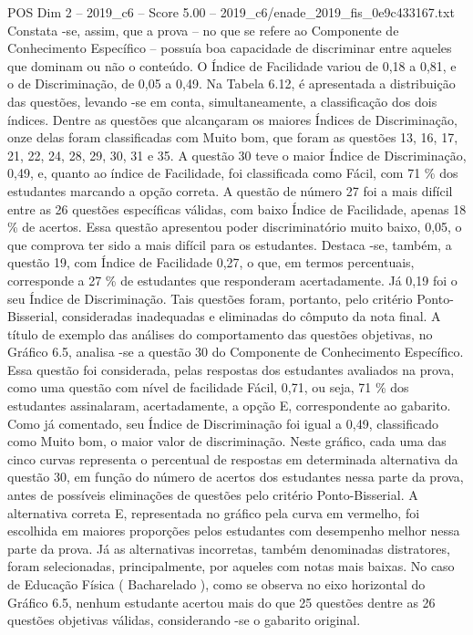 \begin{textsample}{POS Dim 2 – 2019\_c6 – Score 5.00 – 2019\_c6/enade\_2019\_fis\_0e9c433167.txt}
Constata -se, assim, que a prova – no que se refere ao Componente de Conhecimento Específico – possuía boa capacidade de discriminar entre aqueles que dominam ou não o conteúdo.
O Índice de Facilidade variou de 0,18 a 0,81, e o de Discriminação, de 0,05 a 0,49.
Na Tabela 6.12, é apresentada a distribuição das questões, levando -se em conta, simultaneamente, a classificação dos dois índices.
Dentre as questões que alcançaram os maiores Índices de Discriminação, onze delas foram classificadas com Muito bom, que foram as questões 13, 16, 17, 21, 22, 24, 28, 29, 30, 31 e 35.
A questão 30 teve o maior Índice de Discriminação, 0,49, e, quanto ao índice de Facilidade, foi classificada como Fácil, com 71 \% dos estudantes marcando a opção correta.
A questão de número 27 foi a mais difícil entre as 26 questões específicas válidas, com baixo Índice de Facilidade, apenas 18 \% de acertos.
Essa questão apresentou poder discriminatório muito baixo, 0,05, o que comprova ter sido a mais difícil para os estudantes.
Destaca -se, também, a questão 19, com Índice de Facilidade 0,27, o que, em termos percentuais, corresponde a 27 \% de estudantes que responderam acertadamente.
Já 0,19 foi o seu Índice de Discriminação.
Tais questões foram, portanto, pelo critério Ponto-Bisserial, consideradas inadequadas e eliminadas do cômputo da nota final.
A título de exemplo das análises do comportamento das questões objetivas, no Gráfico 6.5, analisa -se a questão 30 do Componente de Conhecimento Específico.
Essa questão foi considerada, pelas respostas dos estudantes avaliados na prova, como uma questão com nível de facilidade Fácil, 0,71, ou seja, 71 \% dos estudantes assinalaram, acertadamente, a opção E, correspondente ao gabarito.
Como já comentado, seu Índice de Discriminação foi igual a 0,49, classificado como Muito bom, o maior valor de discriminação.
Neste gráfico, cada uma das cinco curvas representa o percentual de respostas em determinada alternativa da questão 30, em função do número de acertos dos estudantes nessa parte da prova, antes de possíveis eliminações de questões pelo critério Ponto-Bisserial.
A alternativa correta E, representada no gráfico pela curva em vermelho, foi escolhida em maiores proporções pelos estudantes com desempenho melhor nessa parte da prova.
Já as alternativas incorretas, também denominadas distratores, foram selecionadas, principalmente, por aqueles com notas mais baixas.
No caso de Educação Física ( Bacharelado ), como se observa no eixo horizontal do Gráfico 6.5, nenhum estudante acertou mais do que 25 questões dentre as 26 questões objetivas válidas, considerando -se o gabarito original.

\end{textsample}
